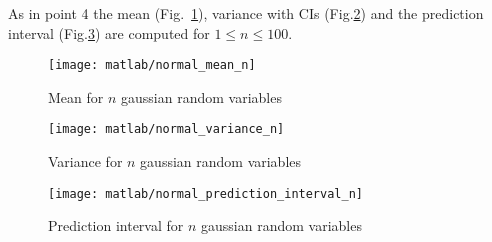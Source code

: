 \documentclass{article}
\begin{document}
\begin{enumerate}
  As in point 4 the mean (Fig.~\ref{gaussian_mean_n}), variance with
  CIs (Fig.\ref{gaussian_var_n}) and the prediction interval
  (Fig.\ref{gaussian_pred_int_n}) are computed for $1 \leq n \leq 100$.
  \begin{figure}[htbp]
    \centering
    \texttt{[image: matlab/normal\_mean\_n]}
    \caption{Mean for $n$ gaussian random variables}
    \label{gaussian_mean_n}
  \end{figure}
  \begin{figure}[htbp]
    \centering
    \texttt{[image: matlab/normal\_variance\_n]}
    \caption{Variance for $n$ gaussian random variables}
    \label{gaussian_var_n}
  \end{figure}
    \begin{figure}[htbp]
    \centering
    \texttt{[image: matlab/normal\_prediction\_interval\_n]}
    \caption{Prediction interval for $n$ gaussian random variables}
    \label{gaussian_pred_int_n}
  \end{figure}

\end{enumerate}
\end{document}
